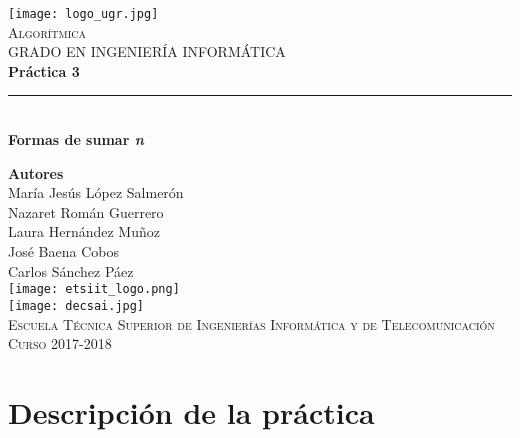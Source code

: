 \documentclass[12pt,spanish]{article}
\begin{document}
\begin{titlepage}

\newlength{\centeroffset}
\setlength{\centeroffset}{-0.5\oddsidemargin}
\addtolength{\centeroffset}{0.5\evensidemargin}
\thispagestyle{empty}

\noindent\hspace*{\centeroffset}
\begin{minipage}{\textwidth}

\centering
\texttt{[image: logo\_ugr.jpg]}\\[1.4cm]

\textsc{ \Large Algorítmica\\[0.2cm]}
\textsc{GRADO EN INGENIERÍA INFORMÁTICA}\\[1cm]

{\Huge\bfseries Práctica 3\\}
\noindent\rule[-1ex]{\textwidth}{3pt}\\[3.5ex]
{\large\bfseries Formas de sumar \emph{n}}
\end{minipage}

\vspace{1.5cm}
\noindent\hspace*{\centeroffset}
\begin{minipage}{\textwidth}
\centering

\textbf{Autores}\\ {María Jesús López Salmerón \\ Nazaret Román Guerrero \\ Laura Hernández Muñoz \\ José Baena Cobos  \\ Carlos Sánchez Páez}\\[2.5ex]
\texttt{[image: etsiit\_logo.png]}\\[0.1cm]
\vspace{1.5cm}
\texttt{[image: decsai.jpg]}\\[0.1cm]
\vspace{1cm}
\textsc{Escuela Técnica Superior de Ingenierías Informática y de Telecomunicación}\\
\vspace{1cm}
\textsc{Curso 2017-2018}
\end{minipage}
\end{titlepage}
\tableofcontents
\thispagestyle{empty}
\listoffigures
\newpage
\setcounter{page}{1}
\section{Descripción de la práctica}


\end{document}

